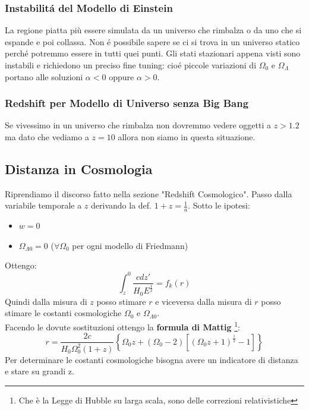 \documentclass[12pt, a4paper]{article}
\begin{document}
\subsubsection{Instabilit\'{a} del Modello di Einstein}
La regione piatta più essere simulata da un universo che rimbalza o da uno che si espande e poi collassa. Non \'{e} possibile sapere se ci si trova in un universo statico perch\'{e} potremmo essere in tutti quei punti. Gli stati stazionari appena visti sono instabili e richiedono un preciso fine tuning: cio\'{e} piccole variazioni di $\Omega_0$ e $\Omega_{\Lambda}$ portano alle soluzioni $\alpha<0$ oppure $\alpha>0$.
\subsubsection{Redshift per Modello di Universo senza Big Bang}
Se vivessimo in un universo che rimbalza non dovremmo vedere oggetti a $z>1.2$ ma dato che vediamo a $z=10$ allora non siamo in questa situazione.
\subsection{Distanza in Cosmologia}
Riprendiamo il discorso fatto nella sezione "Redshift Cosmologico". Passo dalla variabile temporale a $z$ derivando la def. $1+z=\frac{1}{a}$. Sotto le ipotesi:
\begin{itemize}
    \item $w=0$
    \item $\Omega_{\Lambda0}=0$ ($\forall \Omega_0$ per ogni modello di Friedmann)
\end{itemize}
Ottengo:
\begin{equation}
    \int_{z}^{0}\frac{c dz'}{H_0 E^{\frac{1}{2}}}=f_k(r)
\end{equation}
Quindi dalla misura di $z$ posso stimare $r$ e viceversa dalla misura di $r$ posso stimare le costanti cosmologiche $\Omega_0$ e $\Omega_{\Lambda0}$.\\
Facendo le dovute sostituzioni ottengo la \textbf{formula di Mattig} \footnote{Che è la Legge di Hubble su larga scala, sono delle correzioni relativistiche}:
\begin{equation}
    r=\frac{2c}{H_0\Omega_0^2(1+z)}\left\{\Omega_0 z+(\Omega_0-2)[(\Omega_0 z+1)^{\frac{1}{2}}-1]\right\}
\end{equation}
Per determinare le costanti cosmologiche bisogna avere un indicatore di distanza e stare su grandi z.
\end{document}
